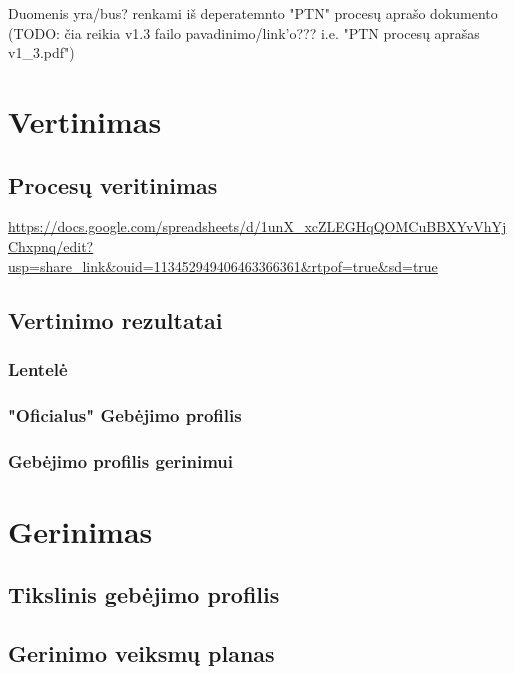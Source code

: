 \documentclass{article}
\begin{document}
Duomenis yra/bus? renkami iš deperatemnto "PTN" procesų aprašo dokumento (TODO: čia reikia v1.3 failo pavadinimo/link'o??? i.e. "PTN procesų aprašas v1\_3.pdf")

\section{Vertinimas}

\subsection{Procesų veritinimas}

\url{https://docs.google.com/spreadsheets/d/1unX_xcZLEGHqQOMCuBBXYvVhYjChxpnq/edit?usp=share_link&ouid=113452949406463366361&rtpof=true&sd=true}

\subsection{Vertinimo rezultatai}

\subsubsection{Lentelė}
\subsubsection{"Oficialus" Gebėjimo profilis}
\subsubsection{Gebėjimo profilis gerinimui}


\section{Gerinimas}

\subsection{Tikslinis gebėjimo profilis}

\subsection{Gerinimo veiksmų planas}
\end{document}
